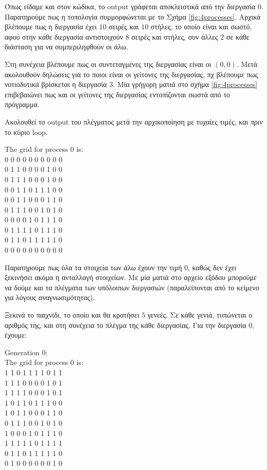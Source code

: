 \begin{multicols}{2}
Όπως είδαμε και στον κώδικα, το output γράφεται αποκλειστικά από την διεργασία $0$. Παρατηρούμε πως η τοπολογία συμμορφώνεται με το Σχήμα \ref{fig:4processes}. Αρχικά βλέπουμε πως η διεργασία έχει $10$ σειρές και $10$ στήλες, το οποίο είναι και σωστό, αφού στην κάθε διεργασία αντιστοιχούν $8$ σειρές και στήλες, συν άλλες $2$ σε κάθε διάσταση για να συμπεριληφθούν οι άλω. \par
Στη συνέχεια βλέπουμε πως οι συντεταγμένες της διεργασίας είναι οι $(0,0)$. Μετά ακολουθούν δηλώσεις για το ποιοι είναι οι γείτονες της διεργασίας, πχ βλέπουμε πως νοτιοδυτικά βρίσκεται η διεργασία $3$. Μία γρήγορη ματιά στο σχήμα \ref{fig:4processes} επιβεβαιώνει πως και οι γείτονες της διεργασίας εντοπίζονται σωστά από το πρόγραμμα. \par
Ακολουθεί το output του πλέγματος μετά την αρχικοποίηση με τυχαίες τιμές, και \emph{πριν} το κύριο loop.
\begin{tcolorbox}
\centering
The grid for process 0 is: \\
0 0 0 0 0 0 0 0 0 0 \\
0 1 1 0 0 0 0 1 0 0 \\
0 1 1 1 0 0 0 1 0 0 \\
0 0 1 1 0 1 1 1 0 0 \\
0 0 1 1 0 0 0 1 1 0 \\
0 1 1 1 0 0 1 0 1 0 \\
0 0 0 0 1 0 1 1 1 0 \\
0 1 1 1 1 0 1 1 1 0 \\
0 1 1 0 1 1 1 1 1 0 \\
0 0 0 0 0 0 0 0 0 0 \\
\end{tcolorbox}

Παρατηρούμε πως όλα τα στοιχεία των άλω έχουν την τιμή $0$, καθώς δεν έχει ξεκινήσει ακόμα η ανταλλαγή στοιχείων. Με μία ματιά στο αρχείο εξόδου μπορούμε να δούμε και τα πλέγματα των υπόλοιπων διεργασιών (παραλείπονται από το κείμενο για λόγους αναγνωσιμότητας). \par
Ξεκινά το παιχνίδι, το οποίο και θα κρατήσει $5$ γενεές. Σε κάθε γενιά, τυπώνεται ο αριθμός της, και στη συνέχεια το πλέγμα της κάθε διεργασίας. Για την διεργασία $0$, έχουμε:

\begin{tcolorbox}
Generation 0: \\
The grid for process 0 is: \\
1 1 0 1 1 1 1 0 1 1 \\
1 1 1 0 0 0 0 1 0 1 \\
1 1 1 1 0 0 0 1 0 1 \\
1 0 1 1 0 1 1 1 0 0 \\
1 0 1 1 0 0 0 1 1 0 \\
0 1 1 1 0 0 1 0 1 0 \\
1 0 0 0 1 0 1 1 1 0 \\
1 1 1 1 1 0 1 1 1 1 \\
0 1 1 0 1 1 1 1 1 0 \\
0 1 0 0 0 0 0 0 1 0 \\
\end{tcolorbox}


\end{multicols}
